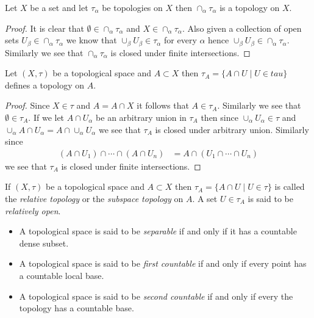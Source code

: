 \begin{prop}\label{UnionOfTopologies}Let $X$ be a set and let $\tau_\alpha$ be topologies on $X$ then $\cap_\alpha \tau_\alpha$ is a topology on $X$.
\end{prop}
\begin{proof}
It is clear that $\emptyset \in \cap_\alpha \tau_\alpha$ and $X \in \cap_\alpha \tau_\alpha$.  Also given a collection of open sets $U_\beta \in \cap_\alpha \tau_\alpha$ we know that
$\cup_\beta U_\beta \in \tau_\alpha$ for every $\alpha$ hence $\cup_\beta U_\beta \in \cap_\alpha \tau_\alpha$.  Similarly we see that $\cap_\alpha \tau_\alpha$ is closed under finite intersections.
\end{proof}

\begin{prop}\label{RelativeTopology}Let $(X, \tau)$ be a topological space and $A \subset X$ then $\tau_A = \lbrace A \cap U \mid U \in tau \rbrace$ defines a topology on $A$.
\end{prop}
\begin{proof}
Since $X \in \tau$ and $A = A \cap X$ it follows that $A \in \tau_A$.  Similarly we see that $\emptyset \in \tau_A$.  If we let $A \cap U_\alpha$ be an arbitrary union in $\tau_A$ then since $\cup_\alpha U_\alpha \in \tau$ and $\cup_\alpha A \cap U_\alpha = A \cap \cup_\alpha U_\alpha$ we see that $\tau_A$ is closed under arbitrary union.  Similarly since 
\begin{align*}
(A \cap U_1) \cap \dotsb \cap (A \cap U_n) &= A \cap (U_1 \cap \dotsb \cap U_n)
\end{align*}
we see that $\tau_A$ is closed under finite intersections.
\end{proof}

\begin{defn}If $(X, \tau)$ be a topological space and $A \subset X$ then $\tau_A = \lbrace A \cap U \mid U \in \tau \rbrace$ is called the \emph{relative topology} or the \emph{subspace topology} on $A$.  A set $U \in \tau_A$ is said to be \emph{relatively open}.  
\end{defn}

\begin{defn}
\begin{itemize}
\item[(i)]A topological space is said to be \emph{separable} if and
  only if it has a countable dense subset.
\item[(ii)]A topological space is said to be \emph{first countable} if and
  only if every point has a countable local base.
\item[(ii)]A topological space is said to be \emph{second countable} if and
  only if every the topology has a countable base.
\end{itemize}
\end{defn}

